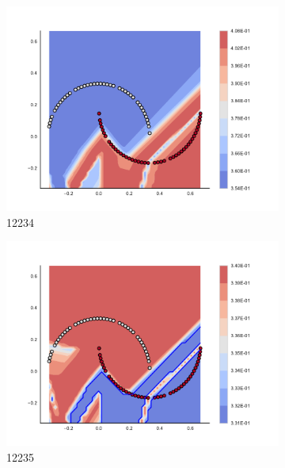 \begin{figure}[h]
\begin{subfigure}[b]{0.09\textwidth}
    \includegraphics[clip, trim=2.35cm 1.75cm 4.5cm 0cm,width=\textwidth]{img/convergence/12234.pdf}
    \caption{12234}
    \label{fig:convergence_12234}
\end{subfigure}
%
\begin{subfigure}[b]{0.09\textwidth}
    \includegraphics[clip, trim=2.35cm 1.75cm 4.5cm 0cm,width=\textwidth]{img/convergence/12235.pdf}
    \caption{12235}
    \label{fig:convergence_12235}
\end{subfigure}
%
\begin{subfigure}[b]{0.09\textwidth}

\end{subfigure}
\end{figure}
